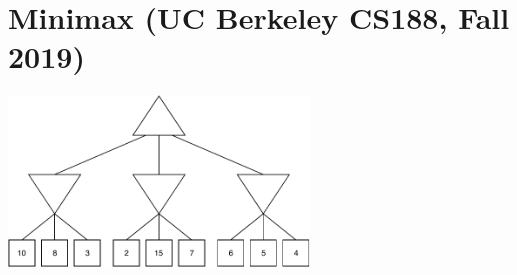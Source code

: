 \documentclass[11pt, a4paper]{article}
\begin{document}
\newpage

\section{Minimax (UC Berkeley CS188, Fall 2019)}

\begin{center}
    \includegraphics[width=0.6\textwidth]{figures/e2_minimax_0.pdf}
\end{center}
\end{document}
